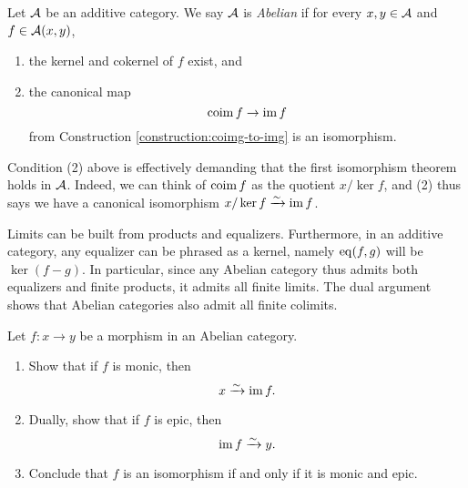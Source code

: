 \begin{definition}
	Let \(\mathcal{A}\) be an additive category. We say \(\mathcal{A}\) is \emph{Abelian} if for every \(x,y\in\mathcal{A}\) and \(f\in\mathcal{A}(x,y)\),
	\begin{enumerate}[label=(\arabic*)]
	\item the kernel and cokernel of \(f\) exist, and
	\item the canonical map
	\[ \operatorname{coim}{f}\to\operatorname{im}{f} \]
	from Construction \ref{construction:coimg-to-img} is an isomorphism.
	\end{enumerate}
\end{definition}
\begin{remark}
	Condition (2) above is effectively demanding that the first isomorphism theorem holds in \(\mathcal{A}\). Indeed, we can think of \(\operatorname{coim}{f}\) as the quotient \(x/\ker{f}\),
	and (2) thus says we have a canonical isomorphism \(x/\ker{f}\xrightarrow{\sim}\operatorname{im}{f}\).
\end{remark}
\begin{remark}
	Limits can be built from products and equalizers. Furthermore, in an additive category, any equalizer can be phrased as a kernel, namely \(\operatorname{eq}(f,g)\) will be \(\ker(f-g)\).
	In particular, since any Abelian category thus admits both equalizers and finite products, it admits all finite limits. The dual argument shows that Abelian categories also
	admit all finite colimits.
\end{remark}
\begin{exercise}\label{exercise:monic-epic-image}
	Let \(f\!:x\to y\) be a morphism in an Abelian category.
	\begin{enumerate}[label=(\arabic*)]
	\item Show that if \(f\) is monic, then
	\[ x\xrightarrow{\sim}\operatorname{im}{f}. \]
	\item Dually, show that if \(f\) is epic, then
	\[ \operatorname{im}{f}\xrightarrow{\sim} y. \]
	\item Conclude that \(f\) is an isomorphism if and only if it is monic and epic.
	\end{enumerate}
\end{exercise}

